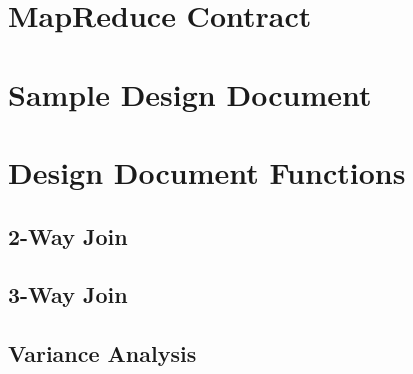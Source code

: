 \section{MapReduce Contract}


\section{Sample Design Document}


\section{Design Document Functions}
\subsection{2-Way Join}



\subsection{3-Way Join}



\subsection{Variance Analysis}

